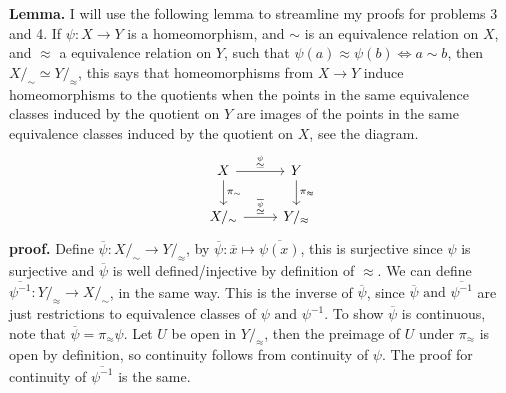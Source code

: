 \documentclass[10.5pt]{article}
\theoremstyle{definition}
\newcommand{\tand}{\text{ and }}
\newcommand{\ism}{\simeq}
\begin{document}
    \textbf{Lemma.} I will use the following lemma to streamline my proofs for problems 3 and 4. \newline
    If \(\psi: X \to Y\) is a homeomorphism, and \(\sim\) is an equivalence relation on \(X\), and \(\approx\) a equivalence relation on \(Y\), such that
    \(\psi(a) \approx \psi(b) \iff a \sim b\), then \(X/_\sim \ism Y/_\approx\), this says that homeomorphisms from \(X \to Y\) induce homeomorphisms to the quotients when the points in the same equivalence
    classes induced by the quotient on \(Y\) are images of the points in the same equivalence classes induced by the quotient on \(X\), see the diagram.
    \begin{equation*} 
        \begin{tikzcd}
            X\arrow[r, "\overset{\psi}{\ism}"] \arrow[d, "\pi_\sim"]& Y\arrow[d, "\pi_\approx"]\\
            X/_\sim\arrow[r, "\overset{\overline{\psi}}{\ism}"]& Y/_\approx
        \end{tikzcd}
    \end{equation*}
    \textbf{proof.} Define \(\overline{\psi}: X/_\sim \to Y/_\approx\), by \(\overline{\psi}: \overline{x} \mapsto \overline{\psi(x)}\), this is surjective since \(\psi\) is surjective and \(\overline{\psi}\) is
    well defined/injective by definition of \(\approx\). We can define \(\overline{\psi^{-1}}: Y/_\approx \to X/_\sim\), in the same way. This is the inverse of \(\overline{\psi}\), since
    \(\overline{\psi} \tand \overline{\psi^{-1}}\) are just restrictions to equivalence classes of \(\psi \tand \psi^{-1}\). To show \(\overline{\psi}\) is continuous, note that
    \(\overline{\psi} = \pi_\approx \psi\). Let \(U\) be open in \(Y/_\approx\), then the preimage of \(U\) under \(\pi_\approx \) is open by definition, so continuity follows from continuity of \(\psi\).
    The proof for continuity of \(\overline{\psi^{-1}}\) is the same.
\end{document}
